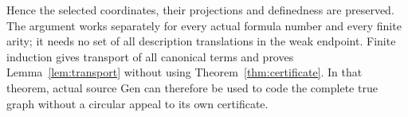 Hence the selected coordinates, their projections and definedness are
preserved. The argument works separately for every actual formula
number and every finite arity; it needs no set of all description
translations in the weak endpoint. Finite induction gives transport
of all canonical terms and proves Lemma~\ref{lem:transport} without
using Theorem~\ref{thm:certificate}. In that theorem, actual source Gen
can therefore be used to code the complete true graph without a
circular appeal to its own certificate.
